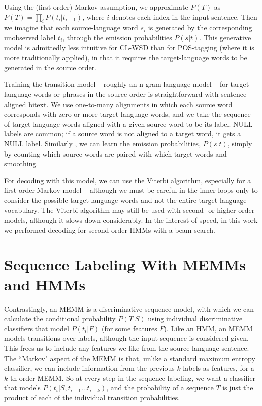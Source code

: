 \documentclass[11pt]{article}
\begin{document}
Using the (first-order) Markov assumption, we approximate $P(T)$ as $P(T) =
\prod_{i} P(t_i | t_{i-1})$, where $i$ denotes each index in the input
sentence. Then we imagine that each source-language word $s_i$ is generated by
the corresponding unobserved label $t_i$, through the emission probabilities
$P(s|t)$. This generative model is admittedly less intuitive for CL-WSD than
for POS-tagging (where it is more traditionally applied), in that it requires
the target-language words to be generated in the source order.

Training the transition model -- roughly an n-gram language model -- for
target-language words or phrases in the source order is straightforward with
sentence-aligned bitext. We use one-to-many alignments in which each source
word corresponds with zero or more target-language words, and we take the
sequence of target-language words aligned with a given source word to be its
label. NULL labels are common; if a source word is not aligned to a target
word, it gets a NULL label. Similarly , we can learn the emission
probabilities, $P(s|t)$, simply by counting which source words are paired with
which target words and smoothing.

For decoding with this model, we can use the Viterbi algorithm, especially for
a first-order Markov model -- although we must be careful in the inner loops
only to consider the possible target-language words and not the entire
target-language vocabulary. The Viterbi algorithm may still be used with
second- or higher-order models, although it slows down considerably. In the
interest of speed, in this work we performed decoding for second-order HMMs
with a beam search.

\section{Sequence Labeling With MEMMs and HMMs}
Contrastingly, an MEMM is a discriminative sequence model, with
which we can calculate the conditional probability $P(T|S)$ using individual
discriminative classifiers that model $P(t_i | F)$ (for some features $F$).
Like an HMM, an MEMM models transitions over labels, although the
input sequence is considered given. This frees us to include any features we
like from the source-language sentence. The ``Markov" aspect of the MEMM is
that, unlike a standard maximum entropy classifier, we can include information
from the previous $k$ labels as features, for a $k$-th order MEMM. So at every
step in the sequence labeling, we want a classifier that models 
$P(t_i | S, t_{i-1}...t_{i-k})$, and the probability of a sequence $T$ is just
the product of each of the individual transition probabilities.
\end{document}
